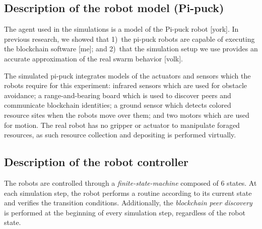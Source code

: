 \documentclass[runningheads]{llncs}
\newcommand{\rab}{range-and-bearing\xspace}
\begin{document}
\subsection{Description of the robot model (Pi-puck)}
The agent used in the simulations is a model of the Pi-puck robot [york]. In previous research, we showed that 1)~the pi-puck robots are capable of executing the blockchain software [me]; and 2)~that the simulation setup we use provides an accurate approximation of the real swarm behavior [volk]. 

The simulated pi-puck integrates models of the actuators and sensors which the robots require for this experiment: infrared sensors which are used for obstacle avoidance; a \rab board which is used to discover peers and communicate blockchain identities; a ground sensor which detects colored resource sites when the robots move over them; and two motors which are used for motion. The real robot has no gripper or actuator to manipulate foraged resources, as such resource collection and depositing is performed virtually. %
 
\subsection{Description of the robot controller}
The robots are controlled through a \emph{finite-state-machine} composed of 6 states. At each simulation step, the robot performs a routine according to its current state and verifies the transition conditions. Additionally, the \emph{blockchain peer discovery} is performed at the beginning of every simulation step, regardless of the robot state.
\end{document}
